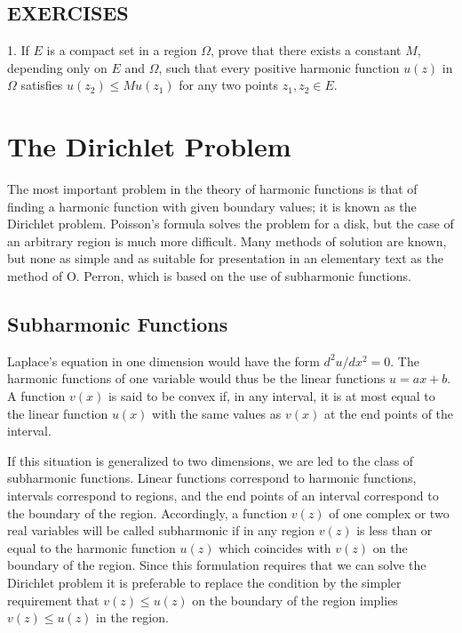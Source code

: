 \subsection*{EXERCISES}
1. If $E$ is a compact set in a region $\Omega$, prove that there exists a constant $M$, depending only on $E$ and $\Omega$, such that every positive harmonic function $u(z)$ in $\Omega$ satisfies $u(z_{2}) \leq Mu(z_{1})$ for any two points $z_{1}, z_{2} \in E$.


\setcounter{section}{3}\section{The Dirichlet Problem}\label{sec:6.4}
The most important problem in the theory of harmonic functions is that of finding a harmonic function with given boundary values; it is known as the Dirichlet problem. Poisson's formula solves the problem for a disk, but the case of an arbitrary region is much more difficult. Many methods of solution are known, but none as simple and as suitable for presentation in an elementary text as the method of O. Perron, which is based on the use of subharmonic functions.

\setcounter{section}{4}\setcounter{subsection}{0}\subsection{Subharmonic Functions}\label{sec:6.4.1}
Laplace's equation in one dimension would have the form $d^{2}u/dx^{2}=0$. The harmonic functions of one variable would thus be the linear functions $u=ax+b$. A function $v(x)$ is said to be convex if, in any interval, it is at most equal to the linear function $u(x)$ with the same values as $v(x)$ at the end points of the interval.

If this situation is generalized to two dimensions, we are led to the class of subharmonic functions. Linear functions correspond to harmonic functions, intervals correspond to regions, and the end points of an interval correspond to the boundary of the region. Accordingly, a function $v(z)$ of one complex or two real variables will be called subharmonic if in any region $v(z)$ is less than or equal to the harmonic function $u(z)$ which coincides with $v(z)$ on the boundary of the region. Since this formulation requires that we can solve the Dirichlet problem it is preferable to replace the condition by the simpler requirement that $v(z) \leq u(z)$ on the boundary of the region implies $v(z) \leq u(z)$ in the region.

